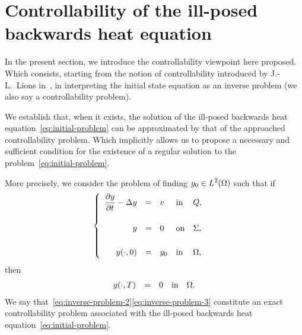 \section{Controllability of the ill-posed backwards heat
equation}\label{sec:controllability}

In the present section, we introduce the controllability viewpoint here
proposed. Which consists, starting from the notion of controllability
introduced by J.-L.~Lions in~\cite[222]{lions1}, in interpreting the
initial state equation as an inverse problem (we also say a controllability
problem).

We establish that, when it exists, the solution of the ill-posed backwards
heat equation~\eqref{eq:initial-problem} can be approximated by that of the
approached controllability problem. Which implicitly allows us to propose a
necessary and sufficient condition for the existence of a regular solution
to the problem~\eqref{eq:initial-problem}.


More precisely, we consider the problem of finding $\displaystyle
y_{0}\in L^{2}\!\left({\Omega}\right)$ such that if
\begin{equation}\label{eq:inverse-problem-2}
    \begin{cases}\displaystyle
        \begin{array}{rclll}
            \dfrac{\partial{}y}{\partial{}t} - \Delta y & = & v & \text{in} & Q,\\
            \\
            y & = & 0 & \text{on} & \Sigma,\\
            \\
            {y}\!\left({\cdot, 0}\right) & = & y_{0} & \text{in} & \Omega,
        \end{array}
    \end{cases}
\end{equation}
then
\begin{equation}\label{eq:inverse-problem-3}
    \begin{array}{rclll}
        {y}\!\left({\cdot,T}\right) & = & 0 & \text{in} & \Omega.
    \end{array}
\end{equation}
We say that~\eqref{eq:inverse-problem-2}\eqref{eq:inverse-problem-3}
constitute an exact controllability problem associated with the ill-posed
backwards heat equation~\eqref{eq:initial-problem}.

